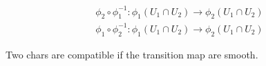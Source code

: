 \documentclass{article} \usepackage{amsmath} \usepackage{amsfonts}
\begin{document}
\begin{equation}
\begin{aligned} 
   \phi_2 \circ \phi_1^{-1}:\phi_1(U_1 \cap U_2) \rightarrow \phi_2(U_1 \cap U_2) \\  
   \phi_1 \circ \phi_2^{-1}:\phi_1(U_1 \cap U_2) \rightarrow \phi_2(U_1 \cap U_2) 
\end{aligned} 
\end{equation}

\begin{defn}
Two chars are compatible if the transition map are smooth.
\end{defn}
\end{document}
